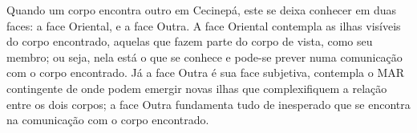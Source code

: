 Quando um corpo encontra outro em Cecinepá, este se deixa conhecer em duas faces: a face Oriental, e a face Outra. A face Oriental contempla as ilhas visíveis do corpo encontrado, aquelas que fazem parte do corpo de vista, como seu membro; ou seja, nela está o que se conhece e pode-se prever numa comunicação com o corpo encontrado. Já a face Outra é sua face subjetiva, contempla o MAR contingente de onde podem emergir novas ilhas que complexifiquem a relação entre os dois corpos; a face Outra fundamenta tudo de inesperado que se encontra na comunicação com o corpo encontrado.